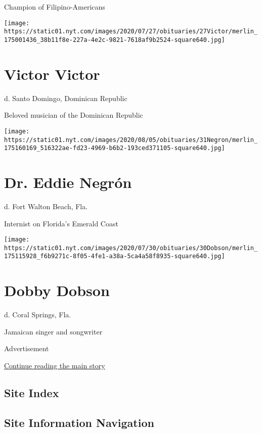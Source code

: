 Champion of Filipino-Americans

\texttt{[image: https://static01.nyt.com/images/2020/07/27/obituaries/27Victor/merlin\_175001436\_38b11f8e-227a-4e2c-9821-7618af9b2524-square640.jpg]}

\hypertarget{victor-victor}{%
\section{Victor Victor}\label{victor-victor}}

d. Santo Domingo, Dominican Republic

Beloved musician of the Dominican Republic

\texttt{[image: https://static01.nyt.com/images/2020/08/05/obituaries/31Negron/merlin\_175160169\_516322ae-fd23-4969-b6b2-193ced371105-square640.jpg]}

\hypertarget{dr-eddie-negruxf3n}{%
\section{Dr. Eddie Negrón}\label{dr-eddie-negruxf3n}}

d. Fort Walton Beach, Fla.

Internist on Florida's Emerald Coast

\texttt{[image: https://static01.nyt.com/images/2020/07/30/obituaries/30Dobson/merlin\_175115928\_f6b9271c-8f05-4fe1-a38a-5ca4a58f8935-square640.jpg]}

\hypertarget{dobby-dobson}{%
\section{Dobby Dobson}\label{dobby-dobson}}

d. Coral Springs, Fla.

Jamaican singer and songwriter

Advertisement

\protect\hyperlink{after-bottom}{Continue reading the main story}

\hypertarget{site-index}{%
\subsection{Site Index}\label{site-index}}

\hypertarget{site-information-navigation}{%
\subsection{Site Information
Navigation}\label{site-information-navigation}}

